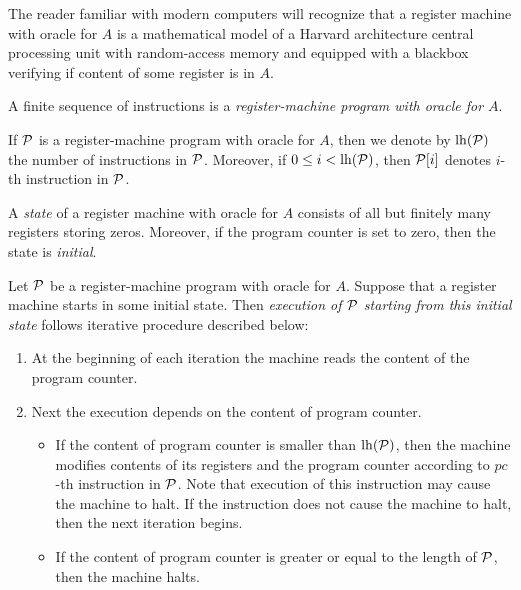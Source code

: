 \documentclass[10pt]{amsart}
\begin{document}
\begin{remark}\label{remark:register_machine_is_cpu_with_ram}
	The reader familiar with modern computers will recognize that a register machine with oracle for $A$ is a mathematical model of a Harvard architecture central processing unit with random-access memory and equipped with a blackbox verifying if content of some register is in $A$.
\end{remark}

\begin{definition}
	A finite sequence of instructions is a \textit{register-machine program with oracle for $A$}.
\end{definition}
\noindent
If ${\mathcal P}$ is a register-machine program with oracle for $A$, then we denote by $\mathrm{lh}({\mathcal P})$ the number of instructions in ${\mathcal P}$. Moreover, if $0 \leq i < \mathrm{lh}({\mathcal P})$, then ${\mathcal P}[i]$ denotes $i$-th instruction in ${\mathcal P}$.

\begin{definition}
	A \textit{state} of a register machine with oracle for $A$ consists of all but finitely many registers storing zeros. Moreover, if the program counter is set to zero, then the state is \textit{initial}.
\end{definition}

\begin{definition}
	Let ${\mathcal P}$ be a register-machine program with oracle for $A$. Suppose that a register machine starts in some initial state. Then \textit{execution of ${\mathcal P}$ starting from this initial state} follows iterative procedure described below:
	\begin{enumerate}[label=\textbf{(\arabic*)}, leftmargin=3.0em]
		\item At the beginning of each iteration the machine reads the content of the program counter.
		\item Next the execution depends on the content of program counter.
		      \begin{itemize}
			      \item[] If the content of program counter is smaller than $\mathrm{lh}({\mathcal P})$, then the machine modifies contents of its registers and the program counter according to $pc$-th instruction in ${\mathcal P}$. Note that execution of this instruction may cause the machine to halt. If the instruction does not cause the machine to halt, then the next iteration begins.
			      \item[] If the content of program counter is greater or equal to the length of ${\mathcal P}$, then the machine halts.
		      \end{itemize}
	\end{enumerate}
\end{definition}
\end{document}

